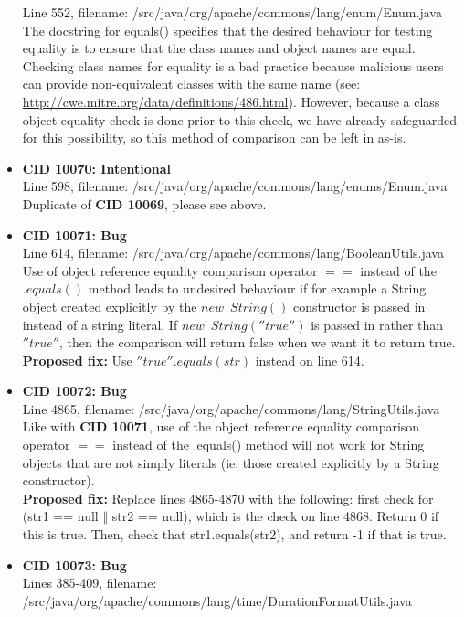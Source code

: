 \documentclass{article}
\begin{document}
\begin{itemize}
    Line 552, filename: /src/java/org/apache/commons/lang/enum/Enum.java \\
    The docstring for equals() specifies that the desired behaviour for testing equality is to ensure that the class names and 
    object names are equal. Checking class names for equality is a bad practice because malicious users can provide non-equivalent
    classes with the same name (see: \url{http://cwe.mitre.org/data/definitions/486.html}). However, because a class object equality 
    check is done prior to this check, we have already safeguarded for this possibility, so this method of comparison can be left in as-is.
\item \textbf{CID 10070: Intentional} \\
    Line 598, filename: /src/java/org/apache/commons/lang/enums/Enum.java \\
    Duplicate of \textbf{CID 10069}, please see above.
\item \textbf{CID 10071: Bug} \\
    Line 614, filename: /src/java/org/apache/commons/lang/BooleanUtils.java \\
    Use of object reference equality comparison operator $==$ instead of the $.equals()$ method leads to undesired behaviour if for example
    a String object created explicitly by the $new \enspace String()$ constructor is passed in instead of a string literal. If $new \enspace String(''true'')$
    is passed in rather than $''true''$, then the comparison will return false when we want it to return true. \\
    \textbf{Proposed fix:} Use $''true''.equals(str)$ instead on line 614.
\item \textbf{CID 10072: Bug} \\
    Line 4865, filename: /src/java/org/apache/commons/lang/StringUtils.java \\
    Like with \textbf{CID 10071}, use of the object reference equality comparison operator $==$ instead of the .equals() method will not work 
    for String objects that are not simply literals (ie. those created explicitly by a String constructor). \\
    \textbf{Proposed fix:} Replace lines 4865-4870 with the following: first check for (str1 == null $\Vert$ str2 == null), which is the check on line 4868.
    Return 0 if this is true. Then, check that str1.equals(str2), and return -1 if that is true.
\item \textbf{CID 10073: Bug} \\
    Lines 385-409, filename: /src/java/org/apache/commons/lang/time/DurationFormatUtils.java \\

\end{itemize}
\end{document}
